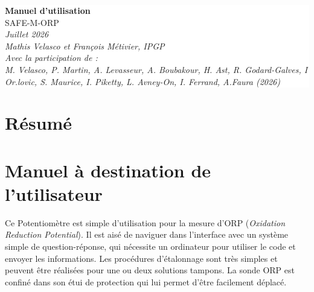 \documentclass{ipgplicence}
\begin{document}
\pagecolor{ipgpred}   %
\color{white}         

\vspace*{6cm}

\begin{center}
\colorbox{white}{%
  \parbox{\textwidth}{%
    \centering
    \color{ipgpred}
    \vspace{1.5cm}
    {\Huge\bfseries Manuel d'utilisation}\\[0.5em]
    {\LARGE SAFE-M-ORP}\\
    \vspace{1cm}
    {\large\itshape Juillet 2026}\\[1em]
    {\large\itshape Mathis Velasco et François Métivier, IPGP}\\[1em]
    {\large\itshape \textit{Avec la participation de :}\\
M. Velasco, P. Martin, A. Levasseur, A. Boubakour, H. Ast, R. Godard-Galves,
 I Or.lovic, S. Maurice, I. Piketty, L. Avney-On, 
 I. Ferrand, A.Faura (2026) }\\[1em]
    
    \vspace{1.5cm}
  }%
}%
\end{center}



\newpage

\pagestyle{fancy}



\section*{Résumé}

\pagecolor{white}\color{black}
\section*{Manuel à destination de l’utilisateur}

Ce Potentiomètre est simple d’utilisation pour la mesure d'ORP (\textit{Oxidation Reduction Potential}). Il est aisé de naviguer dans l’interface avec
un système simple de question-réponse, qui nécessite un ordinateur pour utiliser le code et envoyer
les informations. Les procédures d’étalonnage sont très simples et peuvent être réalisées pour une ou
deux solutions tampons.
La sonde ORP est confiné dans son étui de protection qui lui permet d’être facilement déplacé.\\

\tableofcontents
\newpage
\end{document}
